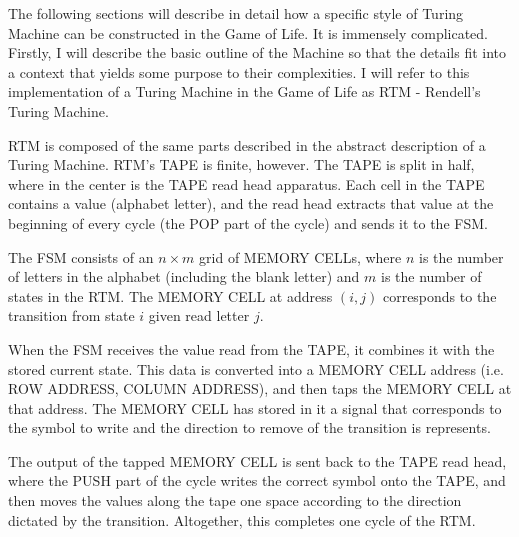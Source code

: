 \documentclass{article}
\begin{document}
The following sections will describe in detail how a specific style of Turing Machine can be constructed in the Game of Life. It is immensely complicated. Firstly, I will describe the basic outline of the Machine so that the details fit into a context that yields some purpose to their complexities. I will refer to this implementation of a Turing Machine in the Game of Life as RTM - Rendell's Turing Machine.





RTM is composed of the same parts described in the abstract description of a Turing Machine. RTM's TAPE is finite, however. The TAPE is split in half, where in the center is the TAPE read head apparatus. Each cell in the TAPE contains a value (alphabet letter), and the read head extracts that value at the beginning of every cycle (the POP part of the cycle) and sends it to the FSM.





The FSM consists of an $  n \times m  $ grid of MEMORY CELLs, where $  n  $ is the number of letters in the alphabet (including the blank letter) and $  m  $ is the number of states in the RTM. The MEMORY CELL at address $  (i,j)  $ corresponds to the transition from state $  i  $ given read letter $  j  $.





When the FSM receives the value read from the TAPE, it combines it with the stored current state. This data is converted into a MEMORY CELL address (i.e. ROW ADDRESS, COLUMN ADDRESS), and then taps the MEMORY CELL at that address. The MEMORY CELL has stored in it a signal that corresponds to the symbol to write and the direction to remove of the transition is represents.





The output of the tapped MEMORY CELL is sent back to the TAPE read head, where the PUSH part of the cycle writes the correct symbol onto the TAPE, and then moves the values along the tape one space according to the direction dictated by the transition. Altogether, this completes one cycle of the RTM.
\end{document}
